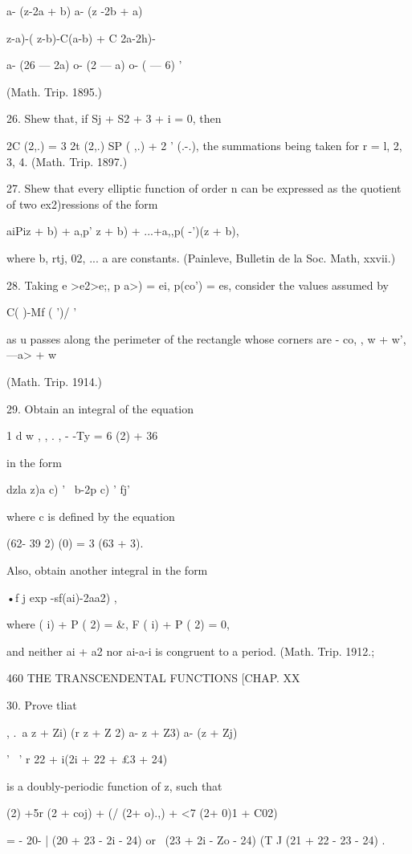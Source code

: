 {a- (z-2a + b) a- (z -2b + a)

  z-a)-( z-b)-C(a-b) + C 2a-2h)-

a- (26 — 2a) o- (2 — a) o- ( — 6) '

(Math. Trip. 1895.)

26. Shew that, if Sj + S2 + 3 + i = 0, then

 2C (2,.) = 3 2t (2,.) SP ( ,.) + 2 ' (.-.), the summations being
taken for r = l, 2, 3, 4. (Math. Trip. 1897.)

27. Shew that every elliptic function of order n can be expressed as
the quotient of two ex2)ressions of the form

aiPiz + b) + a,p' z + b) + ...+a,,p( -')(z + b),

where b, rtj, 02, ... a are constants. (Painleve, Bulletin de la Soc.
Math, xxvii.)

28. Taking e >e2>e;, p a>) = ei, p(co') = es, consider the values
assumed by

C( )-Mf ( ')/ '

as u passes along the perimeter of the rectangle whose corners are -
co, , w + w', —a> + w

(Math. Trip. 1914.)

29. Obtain an integral of the equation

1 d w , , . , - -Ty = 6 (2) + 36

in the form

dzla z)a c) ' \ b-2p c) ' fj'

where c is defined by the equation

(62- 39 2) (0) = 3 (63 + 3).

Also, obtain another integral in the form

 •f j exp -sf(ai)-2aa2) ,

where ( i) + P ( 2) = \&, F ( i) + P ( 2) = 0,

and neither ai + a2 nor ai-a-i is congruent to a period. (Math. Trip.
1912.;

460 THE TRANSCENDENTAL FUNCTIONS [CHAP. XX

30. Prove tliat

, .\ a z + Zi) (r z + Z 2) a- z + Z3) a- (z + Zj)

  '~ ' r 22 + i(2i + 22 + £3 + 24)

is a doubly-periodic function of z, such that

  (2) +5r (2 + coj) + (/ (2+ o).,) + <7 (2+ 0)1 + C02)

= - 20- | (20 + 23 - 2i - 24) or \ (23 + 2i - Zo - 24) (T J (21 + 22 -
23 - 24) .

}
